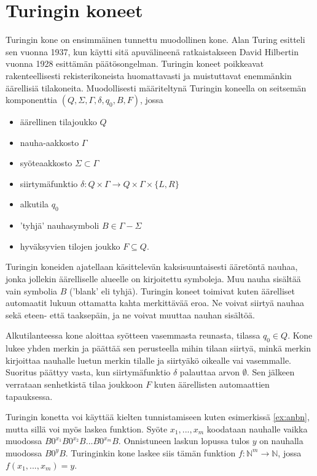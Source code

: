 \documentclass[a4paper, 12pt]{article}
\theoremstyle{definition}
\theoremstyle{plain}
\begin{document}


\section{Turingin koneet}
Turingin kone on ensimmäinen tunnettu muodollinen kone. Alan Turing esitteli sen vuonna 1937, kun käytti sitä apuvälineenä ratkaistakseen David Hilbertin vuonna 1928 esittämän päätösongelman.
Turingin koneet poikkeavat rakenteellisesti rekisterikoneista huomattavasti ja muistuttavat enemmänkin äärellisiä tilakoneita. Muodollisesti määriteltynä Turingin koneella on seitsemän komponenttia $(Q, \Sigma, \Gamma, \delta, q_0, B, F)$, jossa

\begin{itemize}
\item äärellinen tilajoukko $Q$
\item nauha-aakkosto $\Gamma$
\item syöteaakkosto $\Sigma \subset \Gamma$
\item siirtymäfunktio $\delta : Q \times \Gamma \rightarrow Q \times \Gamma \times \{L,R\}$
\item alkutila $q_0$
\item 'tyhjä' nauhasymboli $B \in \Gamma - \Sigma$
\item hyväksyvien tilojen joukko $F \subseteq Q.$
\end{itemize}

Turingin koneiden ajatellaan käsittelevän kaksisuuntaisesti ääretöntä nauhaa, jonka jollekin äärelliselle alueelle on kirjoitettu symboleja. Muu nauha sisältää vain symbolia $B$ ('blank' eli tyhjä).
Turingin koneet toimivat kuten äärelliset automaatit lukuun ottamatta kahta merkittävää eroa. Ne voivat siirtyä nauhaa sekä eteen- että taaksepäin, ja ne voivat muuttaa nauhan sisältöä.

Alkutilanteessa kone aloittaa syötteen vasemmasta reunasta, tilassa $q_0 \in Q$. Kone lukee yhden merkin ja päättää sen perusteella mihin tilaan siirtyä, minkä merkin kirjoittaa nauhalle luetun merkin tilalle ja siirtyäkö oikealle vai vasemmalle. Suoritus päättyy vasta, kun siirtymäfunktio $\delta$ palauttaa arvon $\emptyset$. Sen jälkeen verrataan senhetkistä tilaa joukkoon $F$ kuten äärellisten automaattien tapauksessa.

Turingin konetta voi käyttää kielten tunnistamiseen kuten esimerkissä \ref{ex:anbn}, mutta sillä voi myös laskea funktion. Syöte $x_1, ..., x_m$ koodataan nauhalle vaikka muodossa $B 0^{x_1} B 0^{x_2} B ... B 0^{x_m} B$. Onnistuneen laskun lopussa tulos $y$ on nauhalla muodossa $B 0^y B$. Turinginkin kone laskee siis tämän funktion $f:\mathbb{N}^m \rightarrow\mathbb{N}$, jossa $f(x_1, ..., x_m) = y$.
\end{document}
